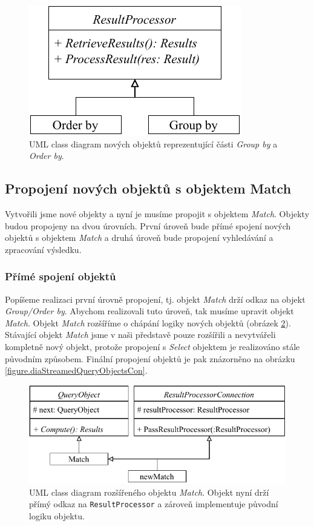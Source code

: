 \begin{figure}[!htp]
\includegraphics{../img/diaStreamedResultProcessor.pdf}\centering
\caption{UML class diagram nových objektů reprezentující části \textit{Group by} a \textit{Order by}.}
\label{figure.diaStreamedResultProcessor}
\end{figure}

\subsection{Propojení nových objektů s objektem Match}

Vytvořili jsme nové objekty a nyní je musíme propojit s objektem \textit{Match}.
Objekty budou propojeny na dvou úrovních.
První úroveň bude přímé spojení nových objektů s objektem \textit{Match} a druhá úroveň bude propojení vyhledávání a zpracování výsledku.

\subsubsection{Přímé spojení objektů} \label{anal.improvement.con1}

Popíšeme realizaci první úrovně propojení, tj. objekt \textit{Match} drží odkaz na objekt \textit{Group/Order by}.
Abychom realizovali tuto úroveň, tak musíme upravit objekt \textit{Match}.
Objekt \textit{Match} rozšíříme o chápání logiky nových objektů (obrázek \ref{figure.diaStreamedQueryObjects}).
Stávající objekt \textit{Match} jsme v naši představě pouze rozšířili a nevytvářeli kompletně nový objekt, protože propojení s \textit{Select} objektem je realizováno stále původním způsobem.
Finální propojení objektů je pak znázorněno na obrázku \ref{figure.diaStreamedQueryObjectsCon}.

\begin{figure}[!htp]
\includegraphics{../img/diaStreamedQueryObjects.pdf}\centering
\caption{UML class diagram rozšířeného objektu \textit{Match}. Objekt nyní drží přímý odkaz na \texttt{ResultProcessor} a zároveň implementuje původní logiku objektu.}
\label{figure.diaStreamedQueryObjects}
\end{figure}

